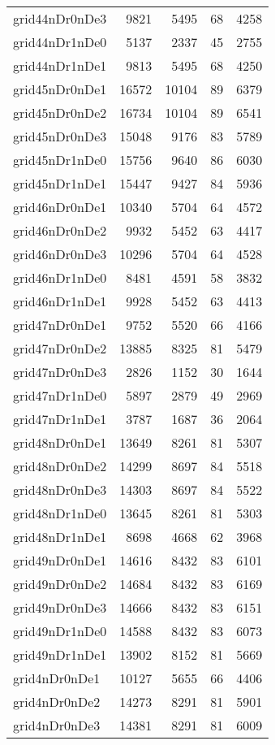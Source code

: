 \begin{longtable}{lrrrr}
grid44nDr0nDe3 & 9821 & 5495 & 68 & 4258 \\
grid44nDr1nDe0 & 5137 & 2337 & 45 & 2755 \\
grid44nDr1nDe1 & 9813 & 5495 & 68 & 4250 \\
grid45nDr0nDe1 & 16572 & 10104 & 89 & 6379 \\
grid45nDr0nDe2 & 16734 & 10104 & 89 & 6541 \\
grid45nDr0nDe3 & 15048 & 9176 & 83 & 5789 \\
grid45nDr1nDe0 & 15756 & 9640 & 86 & 6030 \\
grid45nDr1nDe1 & 15447 & 9427 & 84 & 5936 \\
grid46nDr0nDe1 & 10340 & 5704 & 64 & 4572 \\
grid46nDr0nDe2 & 9932 & 5452 & 63 & 4417 \\
grid46nDr0nDe3 & 10296 & 5704 & 64 & 4528 \\
grid46nDr1nDe0 & 8481 & 4591 & 58 & 3832 \\
grid46nDr1nDe1 & 9928 & 5452 & 63 & 4413 \\
grid47nDr0nDe1 & 9752 & 5520 & 66 & 4166 \\
grid47nDr0nDe2 & 13885 & 8325 & 81 & 5479 \\
grid47nDr0nDe3 & 2826 & 1152 & 30 & 1644 \\
grid47nDr1nDe0 & 5897 & 2879 & 49 & 2969 \\
grid47nDr1nDe1 & 3787 & 1687 & 36 & 2064 \\
grid48nDr0nDe1 & 13649 & 8261 & 81 & 5307 \\
grid48nDr0nDe2 & 14299 & 8697 & 84 & 5518 \\
grid48nDr0nDe3 & 14303 & 8697 & 84 & 5522 \\
grid48nDr1nDe0 & 13645 & 8261 & 81 & 5303 \\
grid48nDr1nDe1 & 8698 & 4668 & 62 & 3968 \\
grid49nDr0nDe1 & 14616 & 8432 & 83 & 6101 \\
grid49nDr0nDe2 & 14684 & 8432 & 83 & 6169 \\
grid49nDr0nDe3 & 14666 & 8432 & 83 & 6151 \\
grid49nDr1nDe0 & 14588 & 8432 & 83 & 6073 \\
grid49nDr1nDe1 & 13902 & 8152 & 81 & 5669 \\
grid4nDr0nDe1 & 10127 & 5655 & 66 & 4406 \\
grid4nDr0nDe2 & 14273 & 8291 & 81 & 5901 \\
grid4nDr0nDe3 & 14381 & 8291 & 81 & 6009 \\

\end{longtable}
